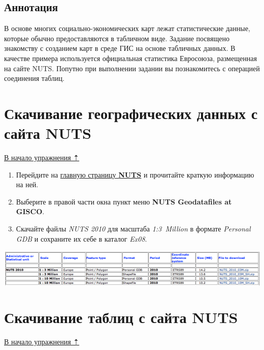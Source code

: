 \documentclass[]{book}
\theoremstyle{definition}
\theoremstyle{definition}
\theoremstyle{definition}
\theoremstyle{remark}
\begin{document}
\hypertarget{stat-map-economic-annotation}{%
\subsection{Аннотация}\label{stat-map-economic-annotation}}

В основе многих социально-экономических карт лежат статистические
данные, которые обычно предоставляются в табличном виде. Задание
посвящено знакомству с созданием карт в среде ГИС на основе табличных
данных. В качестве примера используется официальная статистика
Евросоюза, размещенная на сайте NUTS. Попутно при выполнении задании вы
познакомитесь с операцией соединения таблиц.

\hypertarget{stat-map-economic-nuts-geo}{%
\section{Скачивание географических данных с сайта
NUTS}\label{stat-map-economic-nuts-geo}}

\protect\hyperlink{stat-map-economic}{В начало упражнения ⇡}

\begin{enumerate}
\def\labelenumi{\arabic{enumi}.}
\item
  Перейдите на
  \href{http://epp.eurostat.ec.europa.eu/portal/page/portal/nuts_nomenclature/introduction}{главную
  страницу \textbf{NUTS}} и прочитайте краткую информацию на ней.
\item
  Выберите в правой части окна пункт меню \textbf{NUTS Geodatafiles at
  GISCO}.
\item
  Скачайте файлы \emph{NUTS 2010} для масштаба \emph{1:3~Million} в
  формате \emph{Personal GDB} и сохраните их себе в каталог \emph{Ex08}.
\end{enumerate}

\includegraphics{images/Ex08/image6.png}

\hypertarget{stat-map-economic-nuts-tables}{%
\section{Скачивание таблиц с сайта
NUTS}\label{stat-map-economic-nuts-tables}}

\protect\hyperlink{stat-map-economic}{В начало упражнения ⇡}
\end{document}
